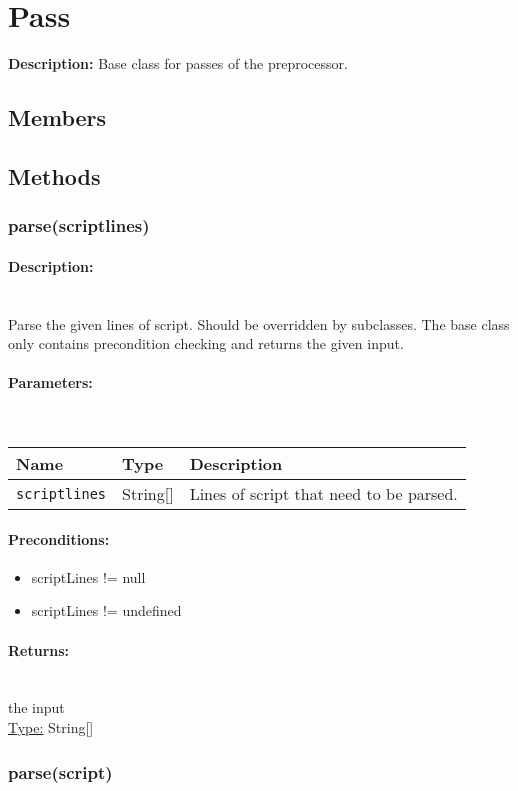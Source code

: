 \section{Pass} 
\textbf{Description: }Base class for passes of the preprocessor.
\subsection{Members} 
\subsection{Methods} 
\subsubsection{parse(scriptlines)} 
\paragraph{Description:} \hfill \\ 
Parse the given lines of script.
Should be overridden by subclasses.
The base class only contains precondition checking and returns the given input.
\paragraph{Parameters:} \hfill \\ 
\begin{tabular}{|l|l|l|}
\hline
\textbf{Name} & \textbf{Type} & \textbf{Description} \\ 
\hline
\texttt{scriptlines} & String[] & Lines of script that need to be parsed.\\ 
\hline
\end{tabular}
\paragraph{Preconditions:} 
\begin{itemize}  
\item  scriptLines != null
\item  scriptLines != undefined
\end{itemize}  
\paragraph{Returns:} \hfill \\ 
the input\\ 
\underline{Type:} String[]
\subsubsection{parse(script)} 
